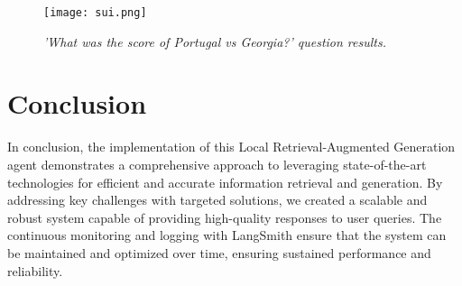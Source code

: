 \begin{figure}[H]
    \centering
    \texttt{[image: sui.png]}
    \caption{
        \it{'What was the score of Portugal vs Georgia?' question results.}
    }
\end{figure}

\section{Conclusion}

In conclusion, the implementation of this Local Retrieval-Augmented Generation agent demonstrates a comprehensive approach to leveraging state-of-the-art technologies for efficient and accurate information retrieval and generation. By addressing key challenges with targeted solutions, we created a scalable and robust system capable of providing high-quality responses to user queries. The continuous monitoring and logging with LangSmith ensure that the system can be maintained and optimized over time, ensuring sustained performance and reliability.